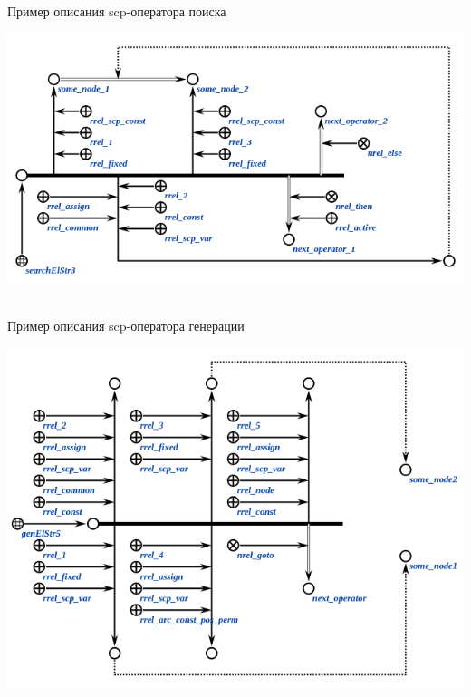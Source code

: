 \begin{frame}{\\Пример описания scp-оператора поиска}
	\topline
	\justifying
	
	\begin{center}
		\includegraphics[scale=0.6]{figures/sd_scp/searchElStr3_faf_2.png}
	\end{center}
	
\end{frame}

\begin{frame}{\\Пример описания scp-оператора генерации}
	\topline
	\justifying
	
	\vspace{10mm}
	
	\begin{center}
		\includegraphics[scale=0.5]{figures/sd_scp/genElStr5_fafaa.png}
	\end{center}
	
\end{frame}

